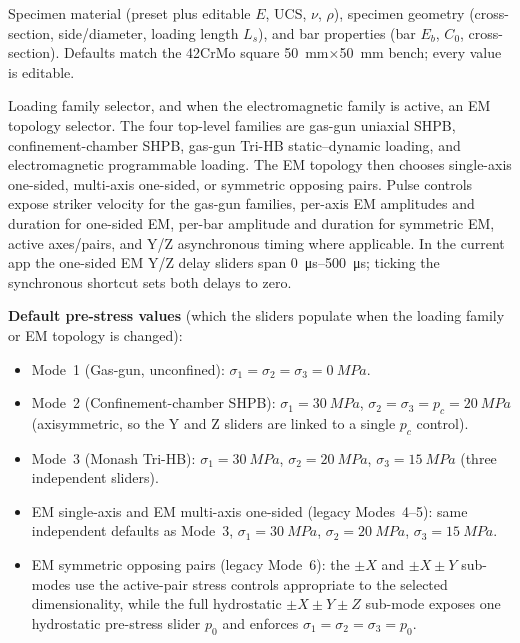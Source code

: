 \documentclass[11pt,a4paper,openany]{book}
\providecommand{\SI}[2]{\qty{#1}{#2}}
\providecommand{\SIrange}[3]{\qtyrange{#1}{#2}{#3}}
\theoremstyle{handbook}
\newcommand{\sig}{\sigma}
\newcommand{\Cz}{C_0}
\newcommand{\Ls}{L_s}
\begin{document}
\begin{description}[leftmargin=2em,style=nextline]
  \item[Experimental setup]
    Specimen material (preset plus editable $E$, UCS, $\nu$, $\rho$),
    specimen geometry (cross-section, side/diameter, loading length
    $\Ls$), and bar properties (bar $E_b$, $\Cz$, cross-section).
    Defaults match the 42CrMo square \SI{50}{mm}$\times$\SI{50}{mm}
    bench; every value is editable.
  \item[Test loading]
    Loading family selector, and when the electromagnetic family is active,
    an EM topology selector. The four top-level families are gas-gun
    uniaxial SHPB, confinement-chamber SHPB, gas-gun Tri-HB
    static--dynamic loading, and electromagnetic programmable loading. The
    EM topology then chooses single-axis one-sided, multi-axis one-sided, or
    symmetric opposing pairs. Pulse controls expose striker velocity for the
    gas-gun families, per-axis EM amplitudes and duration for one-sided EM,
    per-bar amplitude and duration for symmetric EM, active axes/pairs, and
    Y/Z asynchronous timing where applicable. In the current app the
    one-sided EM Y/Z delay sliders span \SIrange{0}{500}{\micro s}; ticking
    the synchronous shortcut sets both delays to zero.

    \medskip\noindent
    \textbf{Default pre-stress values} (which the sliders populate when
    the loading family or EM topology is changed):
    \begin{itemize}[leftmargin=1.5em,itemsep=2pt]
      \item Mode~1 (Gas-gun, unconfined):
            $\sig_1=\sig_2=\sig_3=\SI{0}{MPa}$.
      \item Mode~2 (Confinement-chamber SHPB):
            $\sig_1=\SI{30}{MPa}$, $\sig_2=\sig_3=p_c=\SI{20}{MPa}$
            (axisymmetric, so the Y and Z sliders are linked to a
            single $p_c$ control).
      \item Mode~3 (Monash Tri-HB):
            $\sig_1=\SI{30}{MPa}$, $\sig_2=\SI{20}{MPa}$,
            $\sig_3=\SI{15}{MPa}$ (three independent sliders).
      \item EM single-axis and EM multi-axis one-sided (legacy Modes~4--5):
            same independent defaults as Mode~3,
            $\sig_1=\SI{30}{MPa}$, $\sig_2=\SI{20}{MPa}$,
            $\sig_3=\SI{15}{MPa}$.
      \item EM symmetric opposing pairs (legacy Mode~6): the $\pm X$ and
            $\pm X\pm Y$ sub-modes use the active-pair stress controls
            appropriate to the selected dimensionality, while the full
            hydrostatic $\pm X\pm Y\pm Z$ sub-mode exposes one hydrostatic
            pre-stress slider $p_0$ and enforces
            $\sig_1=\sig_2=\sig_3=p_0$.
    \end{itemize}
\end{description}
\end{document}
